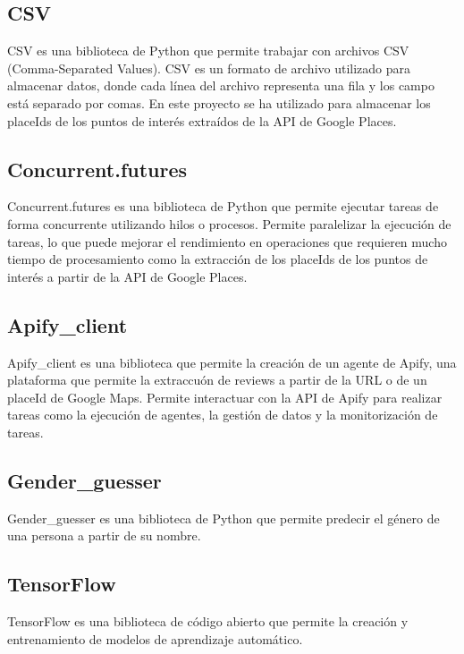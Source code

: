 \subsection{CSV}

CSV es una biblioteca de Python que permite trabajar con archivos CSV (Comma-Separated Values).
CSV es un formato de archivo utilizado para almacenar datos, donde cada línea del archivo representa una fila y los campo está separado por comas.
En este proyecto se ha utilizado para almacenar los placeIds de los puntos de interés extraídos de la API de Google Places.

\subsection{Concurrent.futures}

Concurrent.futures es una biblioteca de Python que permite ejecutar tareas de forma concurrente utilizando hilos o procesos.
Permite paralelizar la ejecución de tareas, lo que puede mejorar el rendimiento en operaciones que requieren mucho tiempo de procesamiento como la extracción de los placeIds de los puntos de interés a partir de la API de Google Places.

\subsection{Apify\_client}

Apify\_client es una biblioteca que permite la creación de un agente de Apify, una plataforma que permite la extraccuón de reviews a partir de la URL o de un placeId de Google Maps. 
Permite interactuar con la API de Apify para realizar tareas como la ejecución de agentes, la gestión de datos y la monitorización de tareas.

\subsection{Gender\_guesser}

Gender\_guesser es una biblioteca de Python que permite predecir el género de una persona a partir de su nombre.

\subsection{TensorFlow}

TensorFlow es una biblioteca de código abierto que permite la creación y entrenamiento de modelos de aprendizaje automático.

